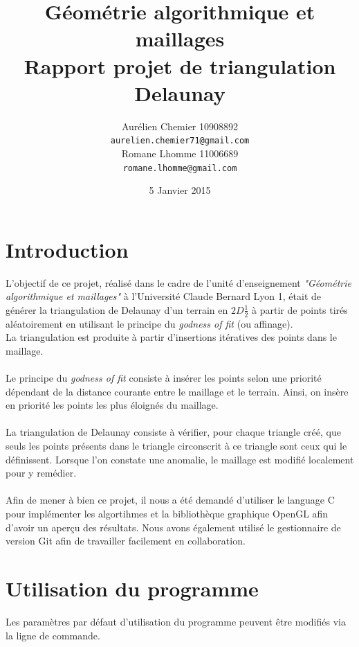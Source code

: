\documentclass{article}
\title{Géométrie algorithmique et maillages \\
        Rapport projet de triangulation Delaunay}
\author{Aurélien Chemier 10908892 \\\texttt{aurelien.chemier71@gmail.com} \\
        Romane Lhomme 11006689  \\\texttt{romane.lhomme@gmail.com} }
\date{5 Janvier 2015}
\begin{document}
\maketitle
\tableofcontents
\newpage

\section{Introduction}
    L'objectif de ce projet, réalisé dans le cadre de l'unité d'enseignement \textit{"Géométrie algorithmique et maillages"} à l'Université Claude Bernard Lyon 1, était de générer la triangulation de Delaunay d'un terrain en $2D\frac{1}{2}$ à partir de points tirés aléatoirement en utilisant le principe du \textit{godness of fit} (ou affinage).
    \\La triangulation est produite à partir d'insertions itératives des points dans le maillage.
    
    \paragraph{}
    Le principe du \textit{godness of fit} consiste à insérer les points selon une priorité dépendant de la distance courante entre le maillage et le terrain. Ainsi, on insère en priorité les points les plus éloignés du maillage.
    
    \paragraph{}
    La triangulation de Delaunay consiste à vérifier, pour chaque triangle créé, que seuls les points présents dans le triangle circonscrit à ce triangle sont ceux qui le définissent. Lorsque l'on constate une anomalie, le maillage est modifié localement pour y remédier.
    
    \paragraph{}
    Afin de mener à bien ce projet, il nous a été demandé d'utiliser le language C pour implémenter les algortihmes et la bibliothèque graphique OpenGL afin d'avoir un aperçu des résultats. Nous avons également utilisé le gestionnaire de version Git afin de travailler facilement en collaboration.
    
\section{Utilisation du programme}
    Les paramètres par défaut d'utilisation du programme peuvent être modifiés via la ligne de commande.
	
\end{document}
